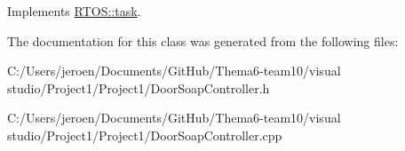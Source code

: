 Implements \hyperlink{class_r_t_o_s_1_1task_addc6d52f8792ddba1158d7ae5ef0037d}{R\+T\+O\+S\+::task}.



The documentation for this class was generated from the following files\+:\begin{DoxyCompactItemize}
\item 
C\+:/\+Users/jeroen/\+Documents/\+Git\+Hub/\+Thema6-\/team10/visual studio/\+Project1/\+Project1/Door\+Soap\+Controller.\+h\item 
C\+:/\+Users/jeroen/\+Documents/\+Git\+Hub/\+Thema6-\/team10/visual studio/\+Project1/\+Project1/Door\+Soap\+Controller.\+cpp\end{DoxyCompactItemize}
